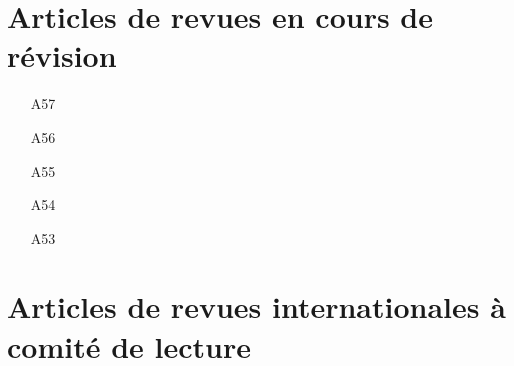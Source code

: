 \documentclass[9pt,french,a4paper,oneside]{article}%
\begin{document}
\section{Articles de revues en cours de révision}%
\begin{enumerate}


\item[A57] 

\item[A56] 

\item[A55] 

\item[A54] 
  
\item[A53] 


\end{enumerate}

\section{Articles de revues internationales à comité de lecture}%
\end{document}
